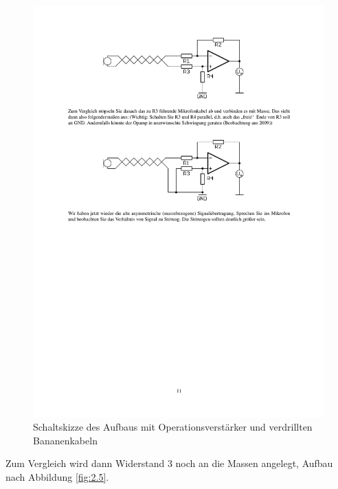 \documentclass[12pt,a4paper]{article}
\begin{document}
\begin{figure}[H] 
  \centering
    \includegraphics[trim = 10mm 230mm 10mm 20mm, clip, scale = 1]{2_3+Op-Amp.pdf}
  	\caption[Schaltskizze des Aufbaus mit Operationsverstärker und verdrillten Bananenkabeln]{Schaltskizze des Aufbaus mit Operationsverstärker und verdrillten Bananenkabeln\footnotemark}
  \label{fig:2.4}
\end{figure}

Zum Vergleich wird dann Widerstand 3 noch an die Massen angelegt, Aufbau nach Abbildung \ref{fig:2.5}.
\end{document}
